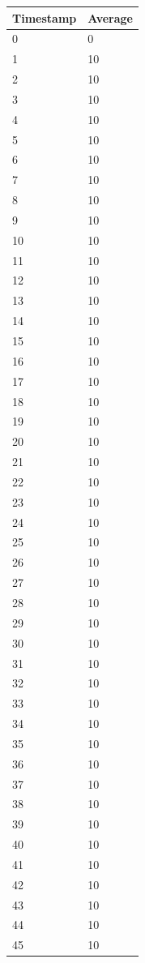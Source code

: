 %
%
\begin{tabular}{|l||l|}
\hline
	\textbf{Timestamp} & \textbf{Average} \\ \hline
	0 & 0 \\ \hline
	1 & 10 \\ \hline
	2 & 10 \\ \hline
	3 & 10 \\ \hline
	4 & 10 \\ \hline
	5 & 10 \\ \hline
	6 & 10 \\ \hline
	7 & 10 \\ \hline
	8 & 10 \\ \hline
	9 & 10 \\ \hline
	10 & 10 \\ \hline
	11 & 10 \\ \hline
	12 & 10 \\ \hline
	13 & 10 \\ \hline
	14 & 10 \\ \hline
	15 & 10 \\ \hline
	16 & 10 \\ \hline
	17 & 10 \\ \hline
	18 & 10 \\ \hline
	19 & 10 \\ \hline
	20 & 10 \\ \hline
	21 & 10 \\ \hline
	22 & 10 \\ \hline
	23 & 10 \\ \hline
	24 & 10 \\ \hline
	25 & 10 \\ \hline
	26 & 10 \\ \hline
	27 & 10 \\ \hline
	28 & 10 \\ \hline
	29 & 10 \\ \hline
	30 & 10 \\ \hline
	31 & 10 \\ \hline
	32 & 10 \\ \hline
	33 & 10 \\ \hline
	34 & 10 \\ \hline
	35 & 10 \\ \hline
	36 & 10 \\ \hline
	37 & 10 \\ \hline
	38 & 10 \\ \hline
	39 & 10 \\ \hline
	40 & 10 \\ \hline
	41 & 10 \\ \hline
	42 & 10 \\ \hline
	43 & 10 \\ \hline
	44 & 10 \\ \hline
	45 & 10 \\ \hline
\end{tabular}
